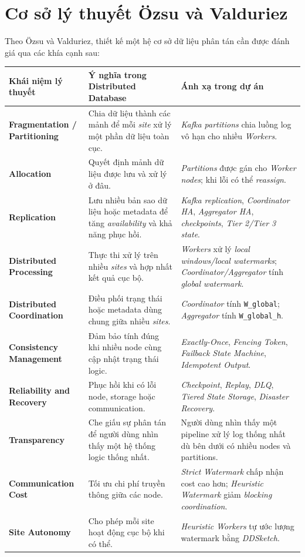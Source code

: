 \documentclass[12pt,a4paper]{article}
\begin{document}
\section{Cơ sở lý thuyết Özsu và Valduriez}

Theo Özsu và Valduriez, thiết kế một hệ cơ sở dữ liệu phân tán cần được đánh giá qua các khía cạnh sau:

\begin{longtable}{p{} p{} p{}}
\toprule
\textbf{Khái niệm lý thuyết} & \textbf{Ý nghĩa trong Distributed Database} & \textbf{Ánh xạ trong dự án} \\
\midrule
\endhead
\textbf{Fragmentation / Partitioning} & Chia dữ liệu thành các mảnh để mỗi \textit{site} xử lý một phần dữ liệu toàn cục. & \textit{Kafka partitions} chia luồng log vô hạn cho nhiều \textit{Workers}. \\
\textbf{Allocation} & Quyết định mảnh dữ liệu được lưu và xử lý ở đâu. & \textit{Partitions} được gán cho \textit{Worker nodes}; khi lỗi có thể \textit{reassign}. \\
\textbf{Replication} & Lưu nhiều bản sao dữ liệu hoặc metadata để tăng \textit{availability} và khả năng phục hồi. & \textit{Kafka replication}, \textit{Coordinator HA}, \textit{Aggregator HA}, \textit{checkpoints}, \textit{Tier 2/Tier 3 state}. \\
\textbf{Distributed Processing} & Thực thi xử lý trên nhiều \textit{sites} và hợp nhất kết quả cục bộ. & \textit{Workers} xử lý \textit{local windows/local watermarks}; \textit{Coordinator/Aggregator} tính \textit{global watermark}. \\
\textbf{Distributed Coordination} & Điều phối trạng thái hoặc metadata dùng chung giữa nhiều \textit{sites}. & \textit{Coordinator} tính \texttt{W\_global}; \textit{Aggregator} tính \texttt{W\_global\_h}. \\
\textbf{Consistency Management} & Đảm bảo tính đúng khi nhiều node cùng cập nhật trạng thái logic. & \textit{Exactly-Once}, \textit{Fencing Token}, \textit{Failback State Machine}, \textit{Idempotent Output}. \\
\textbf{Reliability and Recovery} & Phục hồi khi có lỗi node, storage hoặc communication. & \textit{Checkpoint}, \textit{Replay}, \textit{DLQ}, \textit{Tiered State Storage}, \textit{Disaster Recovery}. \\
\textbf{Transparency} & Che giấu sự phân tán để người dùng nhìn thấy một hệ thống logic thống nhất. & Người dùng nhìn thấy một pipeline xử lý log thống nhất dù bên dưới có nhiều nodes và partitions. \\
\textbf{Communication Cost} & Tối ưu chi phí truyền thông giữa các node. & \textit{Strict Watermark} chấp nhận cost cao hơn; \textit{Heuristic Watermark} giảm \textit{blocking coordination}. \\
\textbf{Site Autonomy} & Cho phép mỗi site hoạt động cục bộ khi có thể. & \textit{Heuristic Workers} tự ước lượng watermark bằng \textit{DDSketch}. \\
\bottomrule
\end{longtable}
\end{document}
